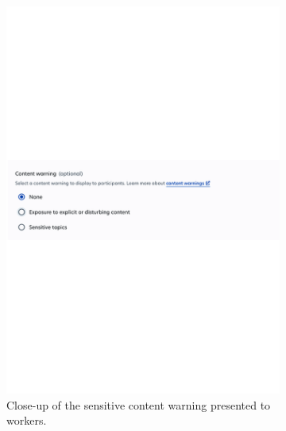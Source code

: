 \begin{figure}[ht]
  \centering
  \begin{subfigure}[b]{0.48\linewidth}
    \centering
    \includegraphics[width=\linewidth]{figures/prolific_zoomedin_binary.pdf}
    \caption{Close-up of the sensitive content warning presented to workers.}
    \label{fig:prolific_zoomed}
  \end{subfigure}
  \hfill
  \begin{subfigure}[b]{0.48\linewidth}
    \centering

\end{subfigure}
\end{figure}
